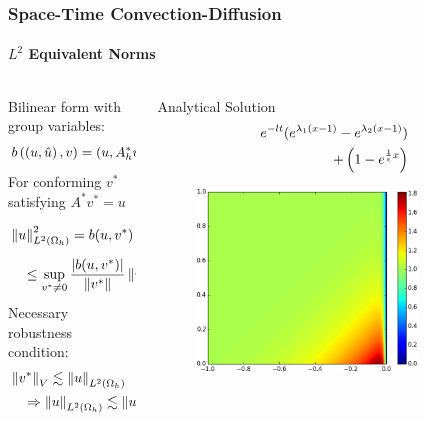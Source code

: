 \documentclass[18pt,xcolor=table]{beamer}
\begin{document}
\begin{frame}[t]
\frametitle{Space-Time Convection-Diffusion}
\framesubtitle{$L^2$ Equivalent Norms}
\begin{columns}[t]
\begin{column}{0.5\textwidth}
\vspace{-3ex}

Bilinear form with group variables:
\[
b\left( \left( u,\hat u \right),v \right) = \left( u,A^*_h v \right)_{L^2\left( \Omega_h \right)} + \left\langle \widehat{u}, \left[ \![v]\! \right] \right\rangle_{\Gamma_h}
\]
For conforming $v^*$ satisfying $A^* v^* = u$
\begin{align*}
&\left\| u \right\|_{L^2\left( \Omega_h \right)}^2= b(u,v^*)
=\frac{b(u,v^*)}{\left\| v^* \right\|_V} \left\| v^* \right\|_V\\
&\quad\leq\sup_{v^*\neq0}\frac{|b(u,v^*)|}{\left\| v^* \right\|}\left\| v^* \right\|
=\left\| u \right\|_E \left\| v^* \right\|_V
\end{align*}
Necessary robustness condition:
\begin{align*}
&\left\| v^* \right\|_V\lesssim\left\| u \right\|_{L^2(\Omega_h)}\\
&\quad\Rightarrow\left\| u \right\|_{L^2(\Omega_h)}\lesssim\left\| u \right\|_E
\end{align*}
\end{column}
\begin{column}{0.5\textwidth}
\vspace{-3ex}
\centering

Analytical Solution
\small{
\begin{align*}
e^{-lt}(e^{\lambda_1(x-1)}-e^{\lambda_2(x-1)})\\
+\left( 1-e^{\frac{1}{\epsilon}x} \right)
\end{align*}
}
\vspace{-2ex}
\begin{figure}[t]
\centering
\includegraphics[width=0.8\textwidth]{Confusion/Robustness/1d_problem.png}
\end{figure}
\end{column}
\end{columns}
\end{frame}
\end{document}
